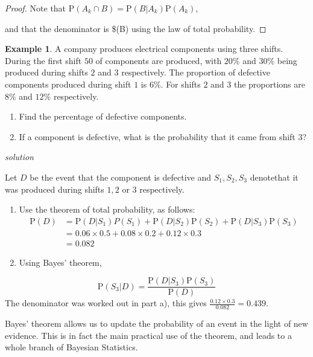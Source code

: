 \documentclass[
]{book}
\theoremstyle{definition}
\theoremstyle{definition}
\newtheorem{example}{Example}[chapter]
\theoremstyle{definition}
\theoremstyle{definition}
\theoremstyle{remark}
\begin{document}
\begin{proof}
Note that \(\text{P}(A_k\cap B) = \text{P}(B|A_k)\text{P}(A_k)\),

and that the denominator is \$(B) using the law of total probability.
\end{proof}

\begin{example}
A company produces electrical components using three shifts. During the first shift \(50%
\) of components are produced, with \(20\%\) and \(30\%\) being produced during shifts \(2\) and \(3\) respectively. The proportion of defective components produced during shift \(1\) is \(6\%\). For shifts \(2\) and \(3\) the proportions are \(8\%\) and \(12\%\) respectively.

\begin{enumerate}
\def\labelenumi{\alph{enumi})}
\item
  Find the percentage of defective components.
\item
  If a component is defective, what is the probability that it came from shift \(3\)?
\end{enumerate}

\emph{solution}

Let \(D\) be the event that the component is defective and \(S_1,S_2,S_3\) denotethat it was produced during shifts \(1,2\) or \(3\) respectively.

\begin{enumerate}
\def\labelenumi{\alph{enumi})}
\item
  Use the theorem of total probability, as follows:
  \begin{align}
  \text{P}(D)  &= \text{P}(D|S_1)P(S_1)+\text{P}(D|S_2)\text{P}(S_2)+\text{P}(D|S_3)\text{P}(S_3) \\
  &= 0.06\times 0.5 + 0.08\times 0.2 + 0.12\times 0.3 \\
  &= 0.082
  \end{align}
\item
  Using Bayes' theorem,
\end{enumerate}

\[\text{P}(S_3|D) = \frac{\text{P}(D|S_3)\text{P}(S_3)}{\text{P}(D)}\]
The denominator was worked out in part a), this gives \(\frac{0.12\times 0.3}{0.082}=0.439\).
\end{example}

Bayes' theorem allows us to update the probability of an event in the light of new evidence. This is in fact the main practical use of the theorem, and leads to a whole branch of Bayesian Statistics.
\end{document}
